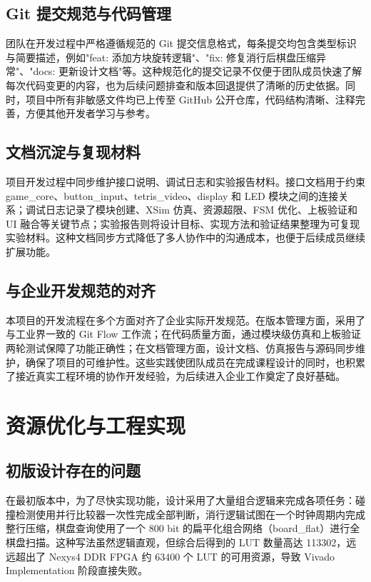 \documentclass[UTF8,zihao=-4]{ctexart}
\begin{document}
\subsection{Git 提交规范与代码管理}
团队在开发过程中严格遵循规范的 Git 提交信息格式，每条提交均包含类型标识与简要描述，例如"feat: 添加方块旋转逻辑"、"fix: 修复消行后棋盘压缩异常"、"docs: 更新设计文档"等。这种规范化的提交记录不仅便于团队成员快速了解每次代码变更的内容，也为后续问题排查和版本回退提供了清晰的历史依据。同时，项目中所有非敏感文件均已上传至 GitHub 公开仓库，代码结构清晰、注释完善，方便其他开发者学习与参考。

\subsection{文档沉淀与复现材料}
项目开发过程中同步维护接口说明、调试日志和实验报告材料。接口文档用于约束 game\_core、button\_input、tetris\_video、display 和 LED 模块之间的连接关系；调试日志记录了模块创建、XSim 仿真、资源超限、FSM 优化、上板验证和 UI 融合等关键节点；实验报告则将设计目标、实现方法和验证结果整理为可复现实验材料。这种文档同步方式降低了多人协作中的沟通成本，也便于后续成员继续扩展功能。

\subsection{与企业开发规范的对齐}
本项目的开发流程在多个方面对齐了企业实际开发规范。在版本管理方面，采用了与工业界一致的 Git Flow 工作流；在代码质量方面，通过模块级仿真和上板验证两轮测试保障了功能正确性；在文档管理方面，设计文档、仿真报告与源码同步维护，确保了项目的可维护性。这些实践使团队成员在完成课程设计的同时，也积累了接近真实工程环境的协作开发经验，为后续进入企业工作奠定了良好基础。

\section{资源优化与工程实现}

\subsection{初版设计存在的问题}
在最初版本中，为了尽快实现功能，设计采用了大量组合逻辑来完成各项任务：碰撞检测使用并行比较器一次性完成全部判断，消行逻辑试图在一个时钟周期内完成整行压缩，棋盘查询使用了一个 800 bit 的扁平化组合网络（board\_flat）进行全棋盘扫描。这种写法虽然逻辑直观，但综合后得到的 LUT 数量高达 113302，远远超出了 Nexys4 DDR FPGA 约 63400 个 LUT 的可用资源，导致 Vivado Implementation 阶段直接失败。
\end{document}
